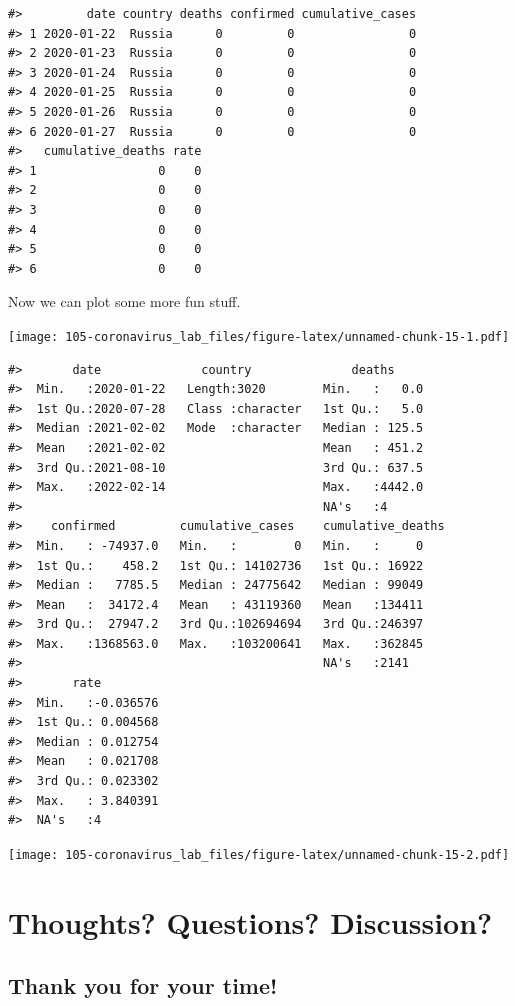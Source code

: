 \documentclass[
]{book}
\begin{document}
\begin{verbatim}
#>         date country deaths confirmed cumulative_cases
#> 1 2020-01-22  Russia      0         0                0
#> 2 2020-01-23  Russia      0         0                0
#> 3 2020-01-24  Russia      0         0                0
#> 4 2020-01-25  Russia      0         0                0
#> 5 2020-01-26  Russia      0         0                0
#> 6 2020-01-27  Russia      0         0                0
#>   cumulative_deaths rate
#> 1                 0    0
#> 2                 0    0
#> 3                 0    0
#> 4                 0    0
#> 5                 0    0
#> 6                 0    0
\end{verbatim}

Now we can plot some more fun stuff.

\texttt{[image: 105-coronavirus\_lab\_files/figure-latex/unnamed-chunk-15-1.pdf]}

\begin{verbatim}
#>       date              country              deaths      
#>  Min.   :2020-01-22   Length:3020        Min.   :   0.0  
#>  1st Qu.:2020-07-28   Class :character   1st Qu.:   5.0  
#>  Median :2021-02-02   Mode  :character   Median : 125.5  
#>  Mean   :2021-02-02                      Mean   : 451.2  
#>  3rd Qu.:2021-08-10                      3rd Qu.: 637.5  
#>  Max.   :2022-02-14                      Max.   :4442.0  
#>                                          NA's   :4       
#>    confirmed         cumulative_cases    cumulative_deaths
#>  Min.   : -74937.0   Min.   :        0   Min.   :     0   
#>  1st Qu.:    458.2   1st Qu.: 14102736   1st Qu.: 16922   
#>  Median :   7785.5   Median : 24775642   Median : 99049   
#>  Mean   :  34172.4   Mean   : 43119360   Mean   :134411   
#>  3rd Qu.:  27947.2   3rd Qu.:102694694   3rd Qu.:246397   
#>  Max.   :1368563.0   Max.   :103200641   Max.   :362845   
#>                                          NA's   :2141     
#>       rate          
#>  Min.   :-0.036576  
#>  1st Qu.: 0.004568  
#>  Median : 0.012754  
#>  Mean   : 0.021708  
#>  3rd Qu.: 0.023302  
#>  Max.   : 3.840391  
#>  NA's   :4
\end{verbatim}

\texttt{[image: 105-coronavirus\_lab\_files/figure-latex/unnamed-chunk-15-2.pdf]}

\hypertarget{thoughts-questions-discussion}{%
\chapter{Thoughts? Questions? Discussion?}\label{thoughts-questions-discussion}}

\hypertarget{thank-you-for-your-time}{%
\section{Thank you for your time!}\label{thank-you-for-your-time}}

  
\end{document}
